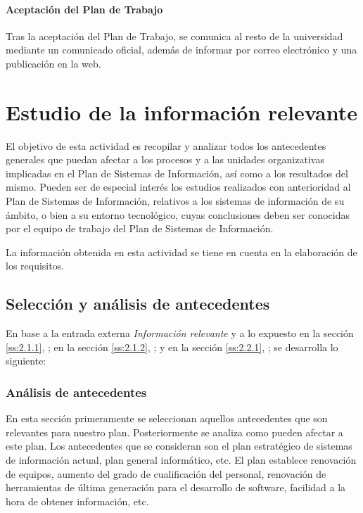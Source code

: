 \documentclass[11pt,a4paper,spanish,twoside]{report}
\begin{document}
\subsubsection{Aceptación del Plan de Trabajo}
Tras la aceptación del Plan de Trabajo, se comunica al resto de la
universidad mediante un comunicado oficial, además de informar por correo
electrónico y una publicación en la web.


\chapter{Estudio de la información relevante}
El objetivo de esta actividad es recopilar y analizar todos los antecedentes
generales que puedan afectar a los procesos y a las unidades organizativas
implicadas en el Plan de Sistemas de Información, así como a los resultados
del mismo. Pueden ser de especial interés los estudios realizados con
anterioridad al Plan de Sistemas de Información, relativos a los sistemas de
información de su ámbito, o bien a su entorno tecnológico, cuyas conclusiones
deben ser conocidas por el equipo de trabajo del Plan de Sistemas de
Información. 

La información obtenida en esta actividad se tiene en cuenta en
la elaboración de los requisitos.

\section{Selección y análisis de antecedentes}
En base a la entrada externa \emph{Información relevante} y a lo expuesto 
en la sección \vref{ss:2.1.1}, \emph{}; 
en la sección \vref{ss:2.1.2}, \emph{}; y
en la sección \vref{ss:2.2.1}, \emph{}; 
se desarrolla lo siguiente:

\subsection{Análisis de antecedentes} \label{ss:3.1.1}
En esta sección primeramente se seleccionan aquellos antecedentes que son
relevantes para nuestro plan. Posteriormente se analiza como pueden
afectar a este plan. Los antecedentes que se consideran son el
plan estratégico de sistemas de información actual, plan general
informático, etc. 
El plan establece renovación de equipos, aumento del grado de cualificación
del personal, renovación de herramientas de última generación para el
desarrollo de software, facilidad a la hora de obtener información, etc. 
\end{document}
